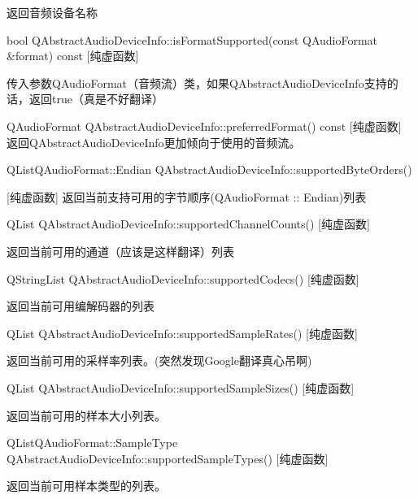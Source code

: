 返回音频设备名称

bool QAbstractAudioDeviceInfo::isFormatSupported(const QAudioFormat \&format) const [纯虚函数] 

传入参数QAudioFormat（音频流）类，如果QAbstractAudioDeviceInfo支持的话，返回true（真是不好翻译）

QAudioFormat QAbstractAudioDeviceInfo::preferredFormat() const [纯虚函数]
 返回QAbstractAudioDeviceInfo更加倾向于使用的音频流。

QListQAudioFormat::Endian QAbstractAudioDeviceInfo::supportedByteOrders() 

[纯虚函数] 返回当前支持可用的字节顺序(QAudioFormat :: Endian)列表

QList QAbstractAudioDeviceInfo::supportedChannelCounts() [纯虚函数] 

返回当前可用的通道（应该是这样翻译）列表

QStringList QAbstractAudioDeviceInfo::supportedCodecs() [纯虚函数] 

返回当前可用编解码器的列表

QList QAbstractAudioDeviceInfo::supportedSampleRates() [纯虚函数] 

返回当前可用的采样率列表。(突然发现Google翻译真心吊啊)

QList QAbstractAudioDeviceInfo::supportedSampleSizes() [纯虚函数] 

返回当前可用的样本大小列表。

QListQAudioFormat::SampleType QAbstractAudioDeviceInfo::supportedSampleTypes() [纯虚函数] 

返回当前可用样本类型的列表。

